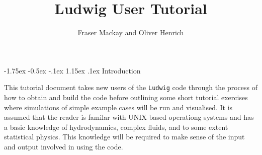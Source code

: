 \documentclass[11pt,twoside,a4paper]{article}
\begin{document}
\setcounter{page}{1}


\newpage
\lstset{style=terminalverbatim}

\setcounter{page}{1}


\makeatletter
\renewcommand*{\section}{%
\@startsection {section}{1}{\z@}%
  {-1.75ex \@plus -0.5ex \@minus -.1ex}%
  {1.15ex \@plus.1ex}%
  {\normalfont\Large\bfseries}%
}
\renewcommand*{\subsection}{%
\@startsection {subsection}{2}{\z@}%
  {-1.75ex \@plus -0.5ex \@minus -.1ex}%
  {1.15ex \@plus.1ex}%
  {\normalfont\large\bfseries}%
}
\renewcommand*{\subsubsection}{%
\@startsection {subsubsection}{1}{\z@}%
  {-1.75ex \@plus -0.5ex \@minus -.1ex}%
  {1.15ex \@plus.1ex}%
  {\normalfont\normalsize\bfseries}%
}

\title{Ludwig User Tutorial}
\author{Fraser Mackay and Oliver Henrich}
\maketitle 
\tableofcontents
\clearpage


\section{Introduction}

This tutorial document takes new users of the \texttt{Ludwig} code through the process of how to obtain 
and build the code before outlining some short tutorial exercises where simulations 
of simple example cases will be run and visualised.
It is assumed that the reader is familar with UNIX-based operationg systems and has 
a basic knowledge of hydrodynamics, complex fluids, and to some extent statistical physics. 
This knowledge will be required to make sense of the input and output involved in using the code. 
\end{document}
